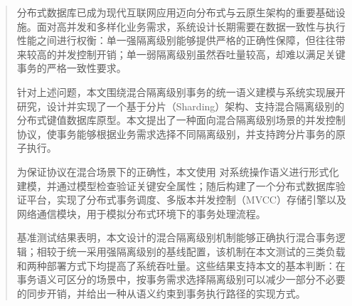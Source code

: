\documentclass[
    type = master,
    degree = professional,
    twoside,
    fontset = win,
    decl-page = true
  ]{njuthesis}
\begin{document}
\maketitle
\raggedbottom

\begin{abstract}
      分布式数据库已成为现代互联网应用迈向分布式与云原生架构的重要基础设施。面对高并发和多样化业务需求，系统设计长期需要在数据一致性与执行性能之间进行权衡：单一强隔离级别能够提供严格的正确性保障，但往往带来较高的并发控制开销；单一弱隔离级别虽然吞吐量较高，却难以满足关键事务的严格一致性要求。

      针对上述问题，本文围绕混合隔离级别事务的统一语义建模与系统实现展开研究，设计并实现了一个基于分片（Sharding）架构、支持混合隔离级别的分布式键值数据库原型。本文提出了一种面向混合隔离级别场景的并发控制协议，使事务能够根据业务需求选择不同隔离级别，并支持跨分片事务的原子执行。

      为保证协议在混合场景下的正确性，本文使用 \TLAPlus 对系统操作语义进行形式化建模，并通过模型检查验证关键安全属性；随后构建了一个分布式数据库验证平台，实现了分布式事务调度、多版本并发控制（MVCC）存储引擎以及网络通信模块，用于模拟分布式环境下的事务处理流程。

      基准测试结果表明，本文设计的混合隔离级别机制能够正确执行混合事务逻辑；相较于统一采用强隔离级别的基线配置，该机制在本文测试的三类负载和两种部署方式下均提高了系统吞吐量。这些结果支持本文的基本判断：在事务语义可区分的场景中，按事务需求选择隔离级别可以减少一部分不必要的同步开销，并给出一种从语义约束到事务执行路径的实现方式。
\end{abstract}
\end{document}
